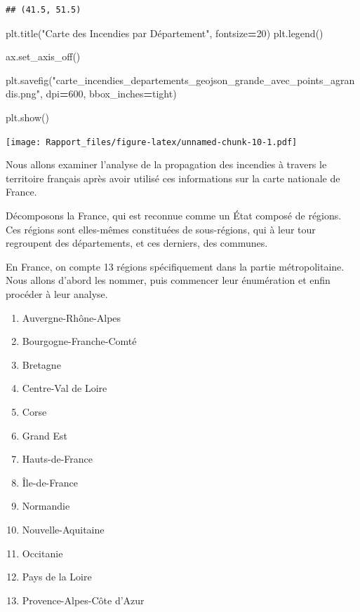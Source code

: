 \documentclass[
]{article}
\newenvironment{Shaded}{\begin{snugshade}}{\end{snugshade}}
\newcommand{\DecValTok}[1]{\textcolor[rgb]{0.00,0.00,0.81}{#1}}
\newcommand{\NormalTok}[1]{#1}
\newcommand{\OperatorTok}[1]{\textcolor[rgb]{0.81,0.36,0.00}{\textbf{#1}}}
\newcommand{\StringTok}[1]{\textcolor[rgb]{0.31,0.60,0.02}{#1}}
\providecommand{\tightlist}{%
  \setlength{\itemsep}{0pt}\setlength{\parskip}{0pt}}
\begin{document}
\begin{verbatim}
## (41.5, 51.5)
\end{verbatim}

\begin{Shaded}
\begin{Highlighting}[]
\NormalTok{plt.title(}\StringTok{"Carte des Incendies par Département"}\NormalTok{, fontsize}\OperatorTok{=}\DecValTok{20}\NormalTok{)}
\NormalTok{plt.legend()}

\NormalTok{ax.set\_axis\_off()}

\NormalTok{plt.savefig(}\StringTok{"carte\_incendies\_departements\_geojson\_grande\_avec\_points\_agrandis.png"}\NormalTok{, dpi}\OperatorTok{=}\DecValTok{600}\NormalTok{, bbox\_inches}\OperatorTok{=}\StringTok{\textquotesingle{}tight\textquotesingle{}}\NormalTok{)}

\NormalTok{plt.show()}
\end{Highlighting}
\end{Shaded}

\texttt{[image: Rapport\_files/figure-latex/unnamed-chunk-10-1.pdf]}

Nous allons examiner l'analyse de la propagation des incendies à travers
le territoire français après avoir utilisé ces informations sur la carte
nationale de France.

Décomposons la France, qui est reconnue comme un État composé de
régions. Ces régions sont elles-mêmes constituées de sous-régions, qui à
leur tour regroupent des départements, et ces derniers, des communes.

En France, on compte 13 régions spécifiquement dans la partie
métropolitaine. Nous allons d'abord les nommer, puis commencer leur
énumération et enfin procéder à leur analyse.

\begin{enumerate}
\def\labelenumi{\arabic{enumi}.}
\tightlist
\item
  Auvergne-Rhône-Alpes
\item
  Bourgogne-Franche-Comté
\item
  Bretagne
\item
  Centre-Val de Loire
\item
  Corse
\item
  Grand Est
\item
  Hauts-de-France
\item
  Île-de-France
\item
  Normandie
\item
  Nouvelle-Aquitaine
\item
  Occitanie
\item
  Pays de la Loire
\item
  Provence-Alpes-Côte d'Azur
\end{enumerate}
\end{document}
